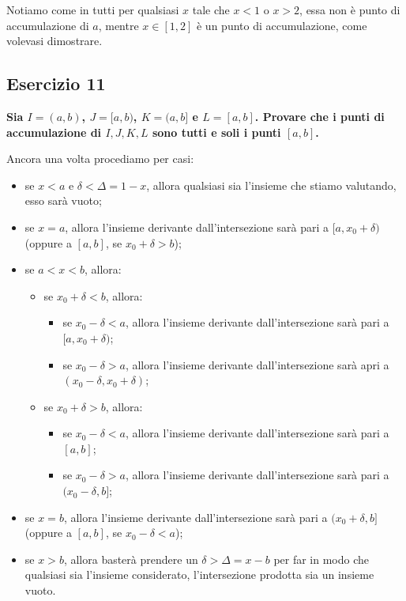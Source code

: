 \documentclass{article}
\begin{document}
\noindent Notiamo come in tutti per qualsiasi $x$ tale che $x < 1$ o $x > 2$, essa non è punto di accumulazione di $a$, mentre $x \in [1, 2]$ è un punto di accumulazione, come volevasi dimostrare.\\

\subsection{Esercizio 11}
\textbf{Sia $I = (a, b)$, $J = [a, b)$, $K = (a, b]$ e $L = [a, b]$. Provare che i punti di accumulazione di $I, J, K, L$ sono tutti e soli i punti $[a, b]$.}

\noindent Ancora una volta procediamo per casi:

\begin{itemize}
    \item se $x < a$ e $\delta < \Delta = 1 - x$, allora qualsiasi sia l'insieme che stiamo valutando, esso sarà vuoto;
    \item se $x = a$, allora l'insieme derivante dall'intersezione sarà pari a $[a, x_0 + \delta)$ (oppure a $[a, b]$, se $x_0 + \delta > b$);
    \item se $a < x < b$, allora:
    \begin{itemize}
        \item se $x_0 + \delta < b$, allora:
        \begin{itemize}
            \item se $x_0 - \delta < a$, allora l'insieme derivante dall'intersezione sarà pari a $[a, x_0 + \delta)$;
            \item se $x_0 - \delta > a$, allora l'insieme derivante dall'intersezione sarà apri a $(x_0 - \delta, x_0 + \delta)$;
        \end{itemize}
        \item se $x_0 + \delta > b$, allora:
        \begin{itemize}
            \item se $x_0 - \delta < a$, allora l'insieme derivante dall'intersezione sarà pari a $[a, b]$;
            \item se $x_0 - \delta > a$, allora l'insieme derivante dall'intersezione sarà pari a $(x_0 - \delta, b]$;
        \end{itemize}
    \end{itemize}
    \item se $x = b$, allora l'insieme derivante dall'intersezione sarà pari a $(x_0 + \delta, b]$ (oppure a $[a, b]$, se $x_0 - \delta < a$);
    \item se $x > b$, allora basterà prendere un $\delta > \Delta = x - b$ per far in modo che qualsiasi sia l'insieme considerato, l'intersezione prodotta sia un insieme vuoto.
\end{itemize}
\end{document}
